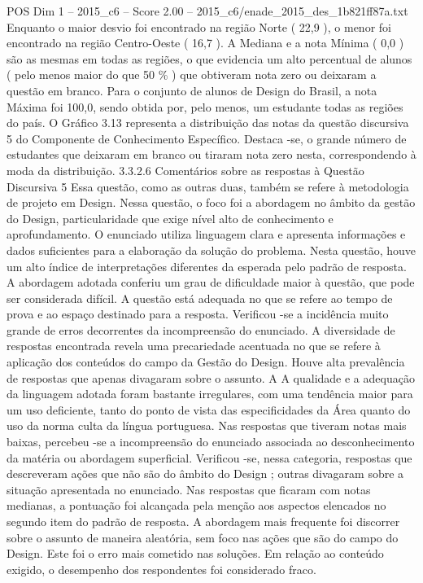 \begin{textsample}{POS Dim 1 – 2015\_c6 – Score 2.00 – 2015\_c6/enade\_2015\_des\_1b821ff87a.txt}
Enquanto o maior desvio foi encontrado na região Norte ( 22,9 ), o menor foi encontrado na região Centro-Oeste ( 16,7 ).
A Mediana e a nota Mínima ( 0,0 ) são as mesmas em todas as regiões, o que evidencia um alto percentual de alunos ( pelo menos maior do que 50 \% ) que obtiveram nota zero ou deixaram a questão em branco.
Para o conjunto de alunos de Design do Brasil, a nota Máxima foi 100,0, sendo obtida por, pelo menos, um estudante todas as regiões do país.
O Gráfico 3.13 representa a distribuição das notas da questão discursiva 5 do Componente de Conhecimento Específico.
Destaca -se, o grande número de estudantes que deixaram em branco ou tiraram nota zero nesta, correspondendo à moda da distribuição. 3.3.2.6 Comentários sobre as respostas à Questão Discursiva 5 Essa questão, como as outras duas, também se refere à metodologia de projeto em Design.
Nessa questão, o foco foi a abordagem no âmbito da gestão do Design, particularidade que exige nível alto de conhecimento e aprofundamento.
O enunciado utiliza linguagem clara e apresenta informações e dados suficientes para a elaboração da solução do problema.
Nesta questão, houve um alto índice de interpretações diferentes da esperada pelo padrão de resposta.
A abordagem adotada conferiu um grau de dificuldade maior à questão, que pode ser considerada difícil.
A questão está adequada no que se refere ao tempo de prova e ao espaço destinado para a resposta.
Verificou -se a incidência muito grande de erros decorrentes da incompreensão do enunciado.
A diversidade de respostas encontrada revela uma precariedade acentuada no que se refere à aplicação dos conteúdos do campo da Gestão do Design.
Houve alta prevalência de respostas que apenas divagaram sobre o assunto.
A A qualidade e a adequação da linguagem adotada foram bastante irregulares, com uma tendência maior para um uso deficiente, tanto do ponto de vista das especificidades da Área quanto do uso da norma culta da língua portuguesa.
Nas respostas que tiveram notas mais baixas, percebeu -se a incompreensão do enunciado associada ao desconhecimento da matéria ou abordagem superficial.
Verificou -se, nessa categoria, respostas que descreveram ações que não são do âmbito do Design ; outras divagaram sobre a situação apresentada no enunciado.
Nas respostas que ficaram com notas medianas, a pontuação foi alcançada pela menção aos aspectos elencados no segundo item do padrão de resposta.
A abordagem mais frequente foi discorrer sobre o assunto de maneira aleatória, sem foco nas ações que são do campo do Design.
Este foi o erro mais cometido nas soluções.
Em relação ao conteúdo exigido, o desempenho dos respondentes foi considerado fraco.

\end{textsample}
